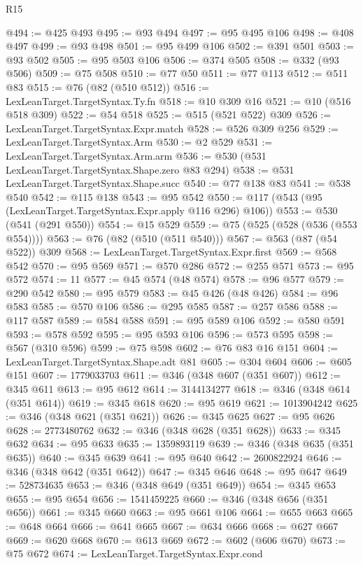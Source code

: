 \begin{lexlean}{R15}
\begin{coremodule}
@494 := @425 @493
@495 := @93 @494
@497 := @95 @495 @106
@498 := @408 @497
@499 := @93 @498
@501 := @95 @499 @106
@502 := @391 @501
@503 := @93 @502
@505 := @95 @503 @106
@506 := @374 @505
@508 := @332 (@93 @506)
@509 := @75 @508
@510 := @77 @50
@511 := @77 @113
@512 := @511 @83
@515 := @76 (@82 (@510 @512))
@516 := LexLeanTarget.TargetSyntax.Ty.fn
@518 := @10 @309 @16
@521 := @10 (@516 @518 @309)
@522 := @54 @518
@525 := @515 (@521 @522) @309
@526 := LexLeanTarget.TargetSyntax.Expr.match
@528 := @526 @309 @256
@529 := LexLeanTarget.TargetSyntax.Arm
@530 := @2 @529
@531 := LexLeanTarget.TargetSyntax.Arm.arm
@536 := @530 (@531 LexLeanTarget.TargetSyntax.Shape.zero @83 @294)
@538 := @531 LexLeanTarget.TargetSyntax.Shape.succ
@540 := @77 @138 @83
@541 := @538 @540
@542 := @115 @138
@543 := @95 @542
@550 := @117 (@543 (@95 (LexLeanTarget.TargetSyntax.Expr.apply @116 @296) @106))
@553 := @530 (@541 (@291 @550))
@554 := @15 @529
@559 := @75 (@525 (@528 (@536 (@553 @554))))
@563 := @76 (@82 (@510 (@511 @540)))
@567 := @563 (@87 (@54 @522)) @309
@568 := LexLeanTarget.TargetSyntax.Expr.first
@569 := @568 @542
@570 := @95 @569
@571 := @570 @286
@572 := @255 @571
@573 := @95 @572
@574 := 11
@577 := @45 @574 (@48 @574)
@578 := @96 @577
@579 := @290 @542
@580 := @95 @579
@583 := @45 @426 (@48 @426)
@584 := @96 @583
@585 := @570 @106
@586 := @295 @585
@587 := @257 @586
@588 := @117 @587
@589 := @584 @588
@591 := @95 @589 @106
@592 := @580 @591
@593 := @578 @592
@595 := @95 @593 @106
@596 := @573 @595
@598 := @567 (@310 @596)
@599 := @75 @598
@602 := @76 @83 @16 @151
@604 := LexLeanTarget.TargetSyntax.Shape.adt @81
@605 := @304 @604
@606 := @605 @151
@607 := 1779033703
@611 := @346 (@348 @607 (@351 @607))
@612 := @345 @611
@613 := @95 @612
@614 := 3144134277
@618 := @346 (@348 @614 (@351 @614))
@619 := @345 @618
@620 := @95 @619
@621 := 1013904242
@625 := @346 (@348 @621 (@351 @621))
@626 := @345 @625
@627 := @95 @626
@628 := 2773480762
@632 := @346 (@348 @628 (@351 @628))
@633 := @345 @632
@634 := @95 @633
@635 := 1359893119
@639 := @346 (@348 @635 (@351 @635))
@640 := @345 @639
@641 := @95 @640
@642 := 2600822924
@646 := @346 (@348 @642 (@351 @642))
@647 := @345 @646
@648 := @95 @647
@649 := 528734635
@653 := @346 (@348 @649 (@351 @649))
@654 := @345 @653
@655 := @95 @654
@656 := 1541459225
@660 := @346 (@348 @656 (@351 @656))
@661 := @345 @660
@663 := @95 @661 @106
@664 := @655 @663
@665 := @648 @664
@666 := @641 @665
@667 := @634 @666
@668 := @627 @667
@669 := @620 @668
@670 := @613 @669
@672 := @602 (@606 @670)
@673 := @75 @672
@674 := LexLeanTarget.TargetSyntax.Expr.cond

\end{coremodule}
\end{lexlean}
